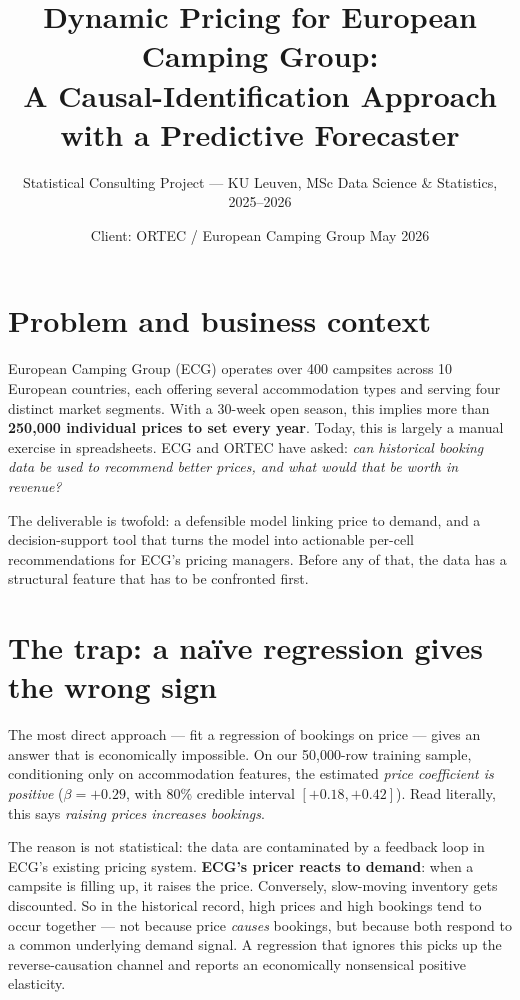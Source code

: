 \documentclass[11pt,a4paper]{article}
\title{Dynamic Pricing for European Camping Group:\\ A Causal-Identification Approach with a Predictive Forecaster}
\author{Statistical Consulting Project --- KU Leuven, MSc Data Science \& Statistics, 2025--2026}
\date{Client: ORTEC / European Camping Group \quad\textbar\quad May 2026}
\begin{document}
\maketitle

\vspace{-1em}

\section{Problem and business context}

European Camping Group (ECG) operates over 400 campsites across 10 European countries, each offering several accommodation types and serving four distinct market segments. With a 30-week open season, this implies more than \textbf{250{,}000 individual prices to set every year}. Today, this is largely a manual exercise in spreadsheets. ECG and ORTEC have asked: \emph{can historical booking data be used to recommend better prices, and what would that be worth in revenue?}

The deliverable is twofold: a defensible model linking price to demand, and a decision-support tool that turns the model into actionable per-cell recommendations for ECG's pricing managers. Before any of that, the data has a structural feature that has to be confronted first.

\section{The trap: a naïve regression gives the wrong sign}

The most direct approach --- fit a regression of bookings on price --- gives an answer that is economically impossible. On our 50{,}000-row training sample, conditioning only on accommodation features, the estimated \emph{price coefficient is positive} ($\beta = +0.29$, with 80\% credible interval $[+0.18, +0.42]$). Read literally, this says \emph{raising prices increases bookings}.

The reason is not statistical: the data are contaminated by a feedback loop in ECG's existing pricing system. \textbf{ECG's pricer reacts to demand}: when a campsite is filling up, it raises the price. Conversely, slow-moving inventory gets discounted. So in the historical record, high prices and high bookings tend to occur together --- not because price \emph{causes} bookings, but because both respond to a common underlying demand signal. A regression that ignores this picks up the reverse-causation channel and reports an economically nonsensical positive elasticity.
\end{document}
